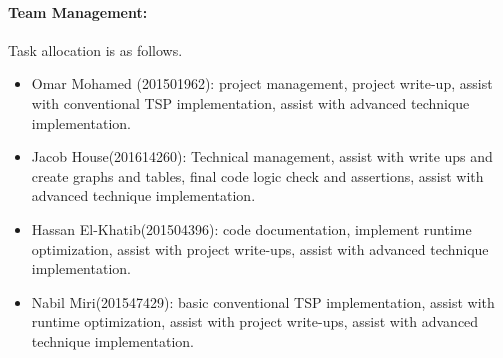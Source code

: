 	\paragraph{Team Management:} Task allocation is as follows.
	\begin{itemize}
		\item Omar Mohamed (201501962): project management, project write-up, assist with conventional TSP implementation, assist with advanced technique implementation.
		\item Jacob House(201614260): Technical management, assist with write ups and create graphs and tables, final code logic check and assertions, assist with advanced technique implementation.
		\item Hassan El-Khatib(201504396): code documentation, implement runtime optimization, assist with project write-ups, assist with advanced technique implementation.
		\item Nabil Miri(201547429): basic conventional TSP implementation, assist with runtime optimization, assist with project write-ups, assist with advanced technique implementation.
	\end{itemize}
	
	\nocite{*}
	\printbibliography

